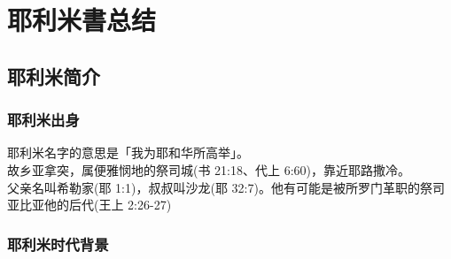 \chapter{耶利米書总结}

\section{耶利米简介}
\subsection{耶利米出身}
耶利米名字的意思是「我为耶和华所高举」。\\
故乡亚拿突，属便雅悯地的祭司城(书 21:18、代上 6:60)，靠近耶路撒冷。\\
父亲名叫希勒家(耶 1:1)，叔叔叫沙龙(耶 32:7)。他有可能是被所罗门革职的祭司亚比亚他的后代(王上 2:26-27)

\subsection{耶利米时代背景}






